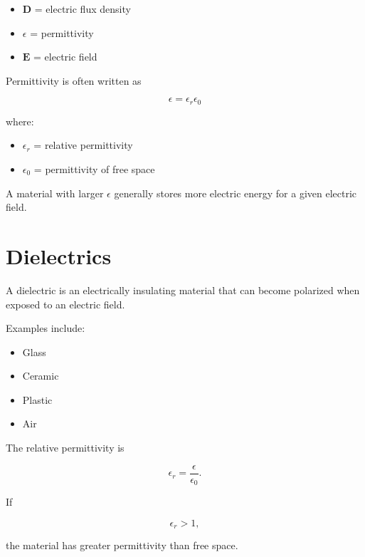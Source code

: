 \documentclass[11pt]{article}
\newcommand{\vect}[1]{\mathbf{#1}}
\begin{document}
\begin{itemize}
    \item $\vect{D}$ = electric flux density
    \item $\epsilon$ = permittivity
    \item $\vect{E}$ = electric field
\end{itemize}

Permittivity is often written as

\[
\boxed{
\epsilon
=
\epsilon_r\epsilon_0
}
\]

where:

\begin{itemize}
    \item $\epsilon_r$ = relative permittivity
    \item $\epsilon_0$ = permittivity of free space
\end{itemize}

A material with larger $\epsilon$ generally stores more electric energy for a given electric field.



\section{Dielectrics}

A dielectric is an electrically insulating material that can become polarized when exposed to an electric field.

Examples include:

\begin{itemize}
    \item Glass
    \item Ceramic
    \item Plastic
    \item Air
\end{itemize}

The relative permittivity is

\[
\epsilon_r
=
\frac{\epsilon}{\epsilon_0}.
\]

If

\[
\epsilon_r>1,
\]

the material has greater permittivity than free space.


\end{document}
